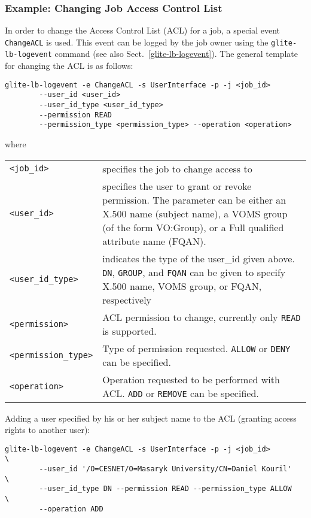 \subsubsection{Example: Changing Job Access Control List}
\label{e:change-acl}

In order to change the Access Control List (ACL) for a job, a special event
\verb'ChangeACL' is used. This event can be logged by the job owner using the
\verb'glite-lb-logevent' command (see also Sect.~\ref{glite-lb-logevent}).
The general template for changing the ACL is as follows:

\begin{verbatim}
glite-lb-logevent -e ChangeACL -s UserInterface -p -j <job_id>
        --user_id <user_id>                                             
        --user_id_type <user_id_type>                                   
        --permission READ
        --permission_type <permission_type> --operation <operation>
\end{verbatim}

where

\begin{tabularx}{\textwidth}{>{\texttt}lX}
\verb'<job_id>'    & specifies the job to change access to\\
\verb'<user_id>'   & specifies the user to grant or revoke permission. The
               parameter can be either an X.500 name
               (subject name), a VOMS group (of the form VO:Group), or a Full
               qualified attribute name (FQAN). \\
\verb'<user_id_type>' & indicates the type of the user\_id given above.
               \verb'DN', \verb'GROUP', and \verb'FQAN' can be given to
               specify X.500 name, VOMS group, or FQAN, respectively \\
\verb'<permission>' & ACL permission to change, currently only \verb'READ' is
               supported. \\
\verb'<permission_type>' & Type of permission requested. \verb'ALLOW' or
               \verb'DENY' can be specified. \\
\verb'<operation>' & Operation requested to be performed with ACL. \verb'ADD'
               or \verb'REMOVE' can be specified. \\
\end{tabularx}

Adding a user specified by his or her subject name to the ACL (\ie granting
access rights to another user):

\begin{verbatim}
glite-lb-logevent -e ChangeACL -s UserInterface -p -j <job_id>          \
        --user_id '/O=CESNET/O=Masaryk University/CN=Daniel Kouril'     \
        --user_id_type DN --permission READ --permission_type ALLOW     \
        --operation ADD
\end{verbatim}


